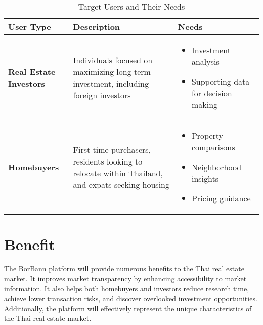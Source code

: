 \begin{table}[htbp]
	\centering
	\renewcommand{\arraystretch}{1.3}
	\begin{tabular}{>{\raggedright\arraybackslash}p{}>{\raggedright\arraybackslash}p{}>{\raggedright\arraybackslash}p{}}
		\toprule \rowcolor[gray]{0.9} \textbf{User Type}        & \textbf{Description}                                                                                 & \textbf{Needs}                                                                                                 \\
		\midrule \textbf{Real Estate Investors}                 & Individuals focused on maximizing long-term investment, including foreign investors & \begin{itemize}\item Investment analysis

\item Supporting data for decision making
\end{itemize}            \\
		\addlinespace \rowcolor[gray]{0.95} \textbf{Homebuyers} & First-time purchasers, residents looking to relocate within Thailand, and expats seeking housing     & \begin{itemize}\item Property comparisons

\item Neighborhood insights

\item Pricing guidance\end{itemize}    \\
		\bottomrule
	\end{tabular}
	\caption{Target Users and Their Needs}
	\label{tab:users}
\end{table}

\section{Benefit}

The BorBann platform will provide numerous benefits to the Thai real estate market.
It improves market transparency by enhancing accessibility to market information.
It also helps both homebuyers and investors reduce research time, achieve lower
transaction risks, and discover overlooked investment opportunities.
Additionally, the platform will effectively represent the unique characteristics
of the Thai real estate market.


